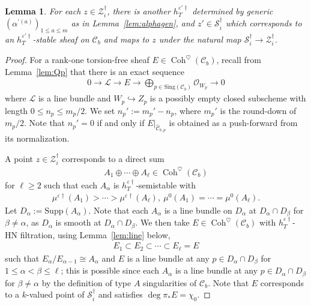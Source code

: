 \documentclass[11pt,oneside,a4paper,mathscr]{amsart}
\newtheorem{lemma}[thm]{Lemma}
\theoremstyle{definition}
\renewcommand{\leq}{\leqslant}
\renewcommand{\geq}{\geqslant}
\newcommand{\cS}{\mathcal{S}}
\newcommand{\cC}{\mathcal{C}}
\newcommand{\Coh}{\operatorname{Coh}}
\begin{document}
\begin{lemma}\label{lemma:nonempty}
For each $z\in \mathcal{Z}_i^{\dag}$, there is another
$h_T^{\varepsilon'\dag}$ determined by generic $(\alpha^{'(a)})_{1\leq a\leq m}$ as in Lemma~\ref{lem:alphagen}, 
and $z' \in \cS_i^{\dag}$
which corresponds to an $h_T^{\varepsilon'\dag}$-stable sheaf on $\cC_b$ 
and maps to $z$
under the natural map $\cS_i^{\dag} \to \mathcal{Z}_i^{\dag}$. 
\end{lemma}
\begin{proof}
For a rank-one torsion-free sheaf $E \in \Coh^{\heartsuit}(\cC_b)$, recall from 
Lemma~\ref{lem:Qp} that there is an exact sequence 
\begin{align*}
    0\to \mathcal{L} \to E \to 
    \bigoplus_{p \in \mathrm{Sing}(\cC_b)}\mathcal{O}_{W_p} \to 0
\end{align*}
where $\mathcal{L}$ is a line bundle and $W_p \hookrightarrow Z_p$ is a possibly empty closed subscheme
with length $0\leq n_p \leq m_p/2$. We set $n_p':=m_p'-n_p$,
where $m_p'$ is the round-down of $m_p/2$. Note that $n_p'=0$ if and only if 
$E|_{\widehat{\cC}_{b, p}}$ is obtained as a push-forward from its normalization. 

A point $z\in \mathcal{Z}_i^{\dag}$ corresponds to a direct sum
\begin{align*}
    A_1 \oplus \cdots \oplus A_{\ell} \in \Coh^{\heartsuit}(\cC_b)
\end{align*}
for $\ell\geq 2$ such that each $A_{\alpha}$ is
$h_T^{\varepsilon\dag}$-semistable with 
\begin{align*}
    \mu^{\varepsilon \dag}(A_1)>\cdots>\mu^{\varepsilon \dag}(A_{\ell}), \ 
    \mu^0(A_1)=\cdots=\mu^0(A_{\ell}).
\end{align*}
Let $D_{\alpha}:=\mathrm{Supp}(A_{\alpha})$. 
Note that each $A_{\alpha}$ is a line bundle on $D_{\alpha}$ at 
$D_{\alpha} \cap D_{\beta}$ for $\beta\neq \alpha$, as $D_{\alpha}$ is smooth at 
$D_{\alpha} \cap D_{\beta}$. 
We then take $E\in \Coh^{\heartsuit}(\cC_b)$ with $h_T^{\varepsilon\dag}$-HN filtration, using Lemma~\ref{lem:line} below,
\begin{align*}
    E_1 \subset E_2 \subset \cdots \subset E_{\ell}=E
\end{align*}
such that $E_{\alpha}/E_{\alpha-1}\cong A_{\alpha}$ and $E$ is a line bundle at any 
$p \in D_{\alpha} \cap D_{\beta}$ 
for $1\leq \alpha<\beta \leq \ell$; this is possible since each $A_{\alpha}$ is a line bundle at any 
$p\in D_{\alpha} \cap D_{\beta}$ 
for $\beta\neq \alpha$ by the definition of type $A$ singularities of $\cC_b$. 
Note that $E$ corresponds to a $k$-valued point of $\cS_i^{\dag}$ and 
satisfies $\deg \pi_{*}E=\chi_0$. 


\end{proof}
\end{document}
